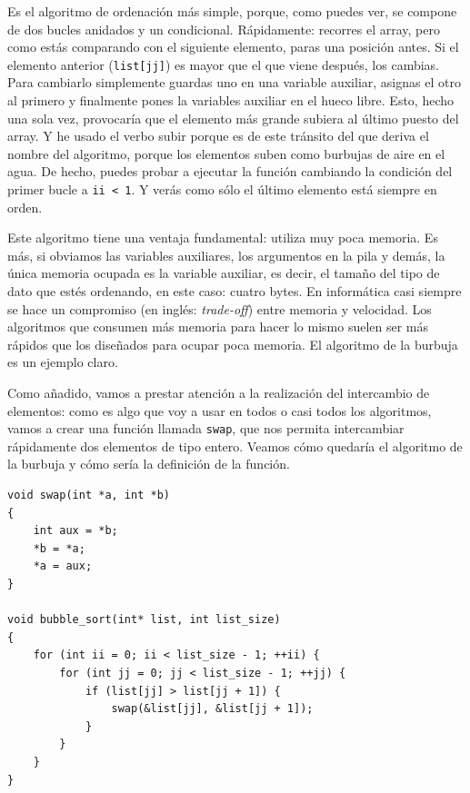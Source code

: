 \documentclass[a4paper]{article}
\begin{document}
Es el algoritmo de ordenación más simple, porque, como puedes ver, se compone
de dos bucles anidados y un condicional. Rápidamente: recorres el array,
pero como estás comparando con el siguiente elemento, paras una posición antes.
Si el elemento anterior (\verb!list[jj]!) es mayor que el que viene después,
los cambias. Para cambiarlo simplemente guardas uno en una variable auxiliar,
asignas el otro al primero y finalmente pones la variables auxiliar en el
hueco libre. Esto, hecho una sola vez, provocaría que el elemento más grande
subiera al último puesto del array. Y he usado el verbo subir porque es de
este tránsito del que deriva el nombre del algoritmo, porque los elementos
suben como burbujas de aire en el agua.
De hecho, puedes probar
a ejecutar la función cambiando la condición del primer bucle a \verb!ii < 1!.
Y verás como sólo el último elemento está siempre en orden.

Este algoritmo tiene una ventaja fundamental: utiliza muy poca memoria. Es más,
si obviamos las variables auxiliares, los argumentos en la pila y demás, la
única memoria ocupada es la variable auxiliar, es decir, el tamaño del tipo
de dato que estés ordenando, en este caso: cuatro bytes. En informática casi
siempre se hace un compromiso (en inglés: \textit{trade-off}) entre memoria y
velocidad. Los algoritmos que consumen más memoria para hacer lo mismo suelen
ser más rápidos que los diseñados para ocupar poca memoria. El algoritmo de
la burbuja es un ejemplo claro.

Como añadido, vamos a prestar atención a la realización del intercambio de
elementos: como es algo que voy a usar en todos o casi todos los algoritmos,
vamos a crear una función llamada \verb!swap!, que nos permita intercambiar
rápidamente dos elementos de tipo entero. Veamos cómo quedaría el algoritmo
de la burbuja y cómo sería la definición de la función.

\noindent
\begin{minipage}[H]{\linewidth}
\mbox{}
\begin{lstlisting}[style=C,
caption={Implementación de \texttt{swap} y uso en algoritmo de la burbuja},
label={lst:bubbleSwap}]
void swap(int *a, int *b)
{
    int aux = *b;
    *b = *a;
    *a = aux;
}

void bubble_sort(int* list, int list_size)
{
    for (int ii = 0; ii < list_size - 1; ++ii) {
        for (int jj = 0; jj < list_size - 1; ++jj) {
            if (list[jj] > list[jj + 1]) {
                swap(&list[jj], &list[jj + 1]);
            }
        }
    }
}
\end{lstlisting}
\end{minipage}
\end{document}
